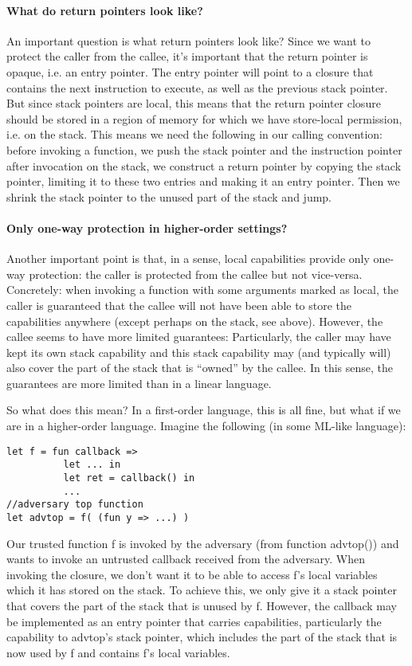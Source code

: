 \documentclass[a4paper]{article}
\begin{document}
\paragraph{What do return pointers look like?}
An important question is what return pointers look like? Since we want to
protect the caller from the callee, it's important that the return pointer is
opaque, i.e. an entry pointer. The entry pointer will point to a closure that
contains the next instruction to execute, as well as the previous stack pointer.
But since stack pointers are local, this means that the return pointer closure
should be stored in a region of memory for which we have store-local permission,
i.e. on the stack. This means we need the following in our calling convention:
before invoking a function, we push the stack pointer and the instruction
pointer after invocation on the stack, we construct a return pointer by
copying the stack pointer, limiting it to these two entries and making it an
entry pointer.  Then we shrink the stack pointer to the unused part of the stack
and jump. 

\paragraph{Only one-way protection in higher-order settings?}
Another important point is that, in a sense, local capabilities provide only
one-way protection: the caller is protected from the callee but not vice-versa.
Concretely: when invoking a function with some arguments marked as local, the
caller is guaranteed that the callee will not have been able to store the
capabilities anywhere (except perhaps on the stack, see above). However, the
callee seems to have more limited guarantees: Particularly, the caller may have
kept its own stack capability and this stack capability may (and typically will)
also cover the part of the stack that is ``owned'' by the callee.  In this
sense, the guarantees are more limited than in a linear language.

So what does this mean? In a first-order language, this is all fine, but what if
we are in a higher-order language. Imagine the following (in some ML-like language):

\begin{verbatim}
let f = fun callback =>
          let ... in 
          let ret = callback() in
          ...
//adversary top function
let advtop = f( (fun y => ...) )
\end{verbatim}

Our trusted function f is invoked by the adversary (from function advtop()) and
wants to invoke an untrusted callback received from the adversary. When invoking
the closure, we don't want it to be able to access f's local variables which it
has stored on the stack. To achieve this, we only give it a stack pointer that
covers the part of the stack that is unused by f. However, the callback may be
implemented as an entry pointer that carries capabilities, particularly the
capability to advtop's stack pointer, which includes the part of the stack that
is now used by f and contains f's local variables.
\end{document}
